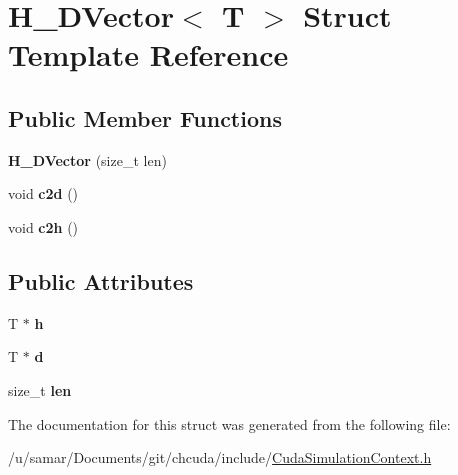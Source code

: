 \hypertarget{structH__DVector}{}\section{H\+\_\+\+D\+Vector$<$ T $>$ Struct Template Reference}
\label{structH__DVector}
\subsection*{Public Member Functions}
\begin{DoxyCompactItemize}
\item 
\hypertarget{structH__DVector_a2bd698e055ab9fc764c8f5c2d41d9681}{}\label{structH__DVector_a2bd698e055ab9fc764c8f5c2d41d9681} 
{\bfseries H\+\_\+\+D\+Vector} (size\+\_\+t len)
\item 
\hypertarget{structH__DVector_a2159806c4ea84d0e4c05d4abc39f53a3}{}\label{structH__DVector_a2159806c4ea84d0e4c05d4abc39f53a3} 
void {\bfseries c2d} ()
\item 
\hypertarget{structH__DVector_a465b8fbf87f6b49c79056417f8b2c138}{}\label{structH__DVector_a465b8fbf87f6b49c79056417f8b2c138} 
void {\bfseries c2h} ()
\end{DoxyCompactItemize}
\subsection*{Public Attributes}
\begin{DoxyCompactItemize}
\item 
\hypertarget{structH__DVector_af179c38eb1d6d2f91c2469f5888f7d77}{}\label{structH__DVector_af179c38eb1d6d2f91c2469f5888f7d77} 
T $\ast$ {\bfseries h}
\item 
\hypertarget{structH__DVector_afd569429b060c6bc721786b039b649f5}{}\label{structH__DVector_afd569429b060c6bc721786b039b649f5} 
T $\ast$ {\bfseries d}
\item 
\hypertarget{structH__DVector_a73b50636c64762d5dd632bdaddab4958}{}\label{structH__DVector_a73b50636c64762d5dd632bdaddab4958} 
size\+\_\+t {\bfseries len}
\end{DoxyCompactItemize}


The documentation for this struct was generated from the following file\+:\begin{DoxyCompactItemize}
\item 
/u/samar/\+Documents/git/chcuda/include/\hyperlink{CudaSimulationContext_8h}{Cuda\+Simulation\+Context.\+h}\end{DoxyCompactItemize}
